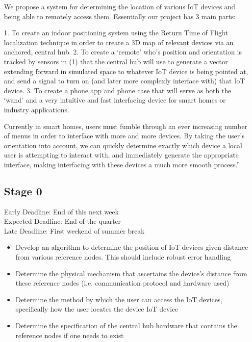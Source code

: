 \documentclass{article}
\begin{document}
We propose a system for determining the location of various IoT devices and being able to remotely access them.
Essentially our project has 3 main parts:

1. To create an indoor positioning system using the Return Time of Flight localization technique in order to create a 3D map of relevant devices via an anchored, central hub.
2. To create a ‘remote’ who’s position and orientation is tracked by sensors in (1) that the central hub will use to generate a vector extending forward in simulated space to whatever IoT device is being pointed at, and send a signal to turn on (and later more complexly interface with) that IoT device.
3. To create a phone app and phone case that will serve as both the ‘wand’ and a very intuitive and fast interfacing device for smart homes or industry applications.

Currently in smart homes, users must fumble through an ever increasing number of menus in order to interface with more and more devices. By taking the user’s orientation into account, we can quickly determine exactly which device a local user is attempting to interact with, and immediately generate the appropriate interface, making interfacing with these devices a much more smooth process.”


\subsection{Stage 0}
Early Deadline: End of this next week \\
Expected Deadline: End of the quarter \\
Late Deadline: First weekend of summer break \\
\begin{itemize}
\item Develop an algorithm to determine the position of IoT devices given distance from various reference nodes. This should include robust error handling
\item Determine the physical mechanism that ascertains the device's distance from these reference nodes (i.e. communication protocol and hardware used)
\item Determine the method by which the user can access the IoT devices, specifically how the user locates the device IoT device
\item Determine the specification of the central hub hardware that contains the reference nodes if one needs to exist
\end{itemize}
\end{document}
